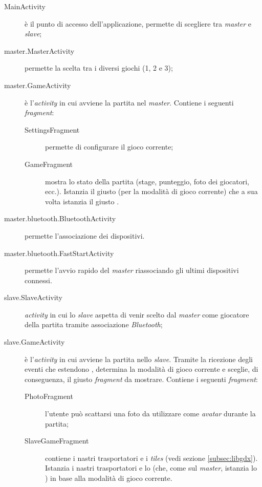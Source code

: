 \begin{description}
\item[MainActivity] è il punto di accesso dell'applicazione, permette di scegliere tra \textit{master} e \textit{slave};
\item[master.MasterActivity] permette la scelta tra i diversi giochi (1, 2 e 3);
\item[master.GameActivity] è l'\textit{activity} in cui avviene la partita nel \textit{master}. Contiene i seguenti \textit{fragment}:
    \begin{description}
        \item[SettingsFragment] permette di configurare il gioco corrente;
        \item[GameFragment] mostra lo stato della partita (stage, punteggio, foto dei giocatori, ecc.). Istanzia il giusto (per la modalità di gioco corrente)  che a sua volta istanzia il giusto .
    \end{description}
\item[master.bluetooth.BluetoothActivity] permette l'associazione dei dispositivi.
\item[master.bluetooth.FastStartActivity] permette l'avvio rapido del \textit{master} riassociando gli ultimi dispositivi connessi.
\item[slave.SlaveActivity] \textit{activity} in cui lo \textit{slave} aspetta di venir scelto dal \textit{master} come giocatore della partita tramite associazione \textit{Bluetooth};
\item[slave.GameActivity] è l'\textit{activity} in cui avviene la partita nello \textit{slave}. Tramite la ricezione degli eventi che estendono , determina la modalità di gioco corrente e sceglie, di conseguenza, il giusto \textit{fragment} da mostrare. Contiene i seguenti \textit{fragment}:
    \begin{description}
        \item[PhotoFragment] l'utente può scattarsi una foto da utilizzare come \textit{avatar} durante la partita;
        \item[SlaveGameFragment] contiene i nastri trasportatori e i \textit{tiles} (vedi sezione \ref{subsec:libgdx}). Istanzia i nastri trasportatori e lo  (che, come sul \textit{master}, istanzia lo ) in base alla modalità di gioco corrente.
    \end{description}
\end{description}


